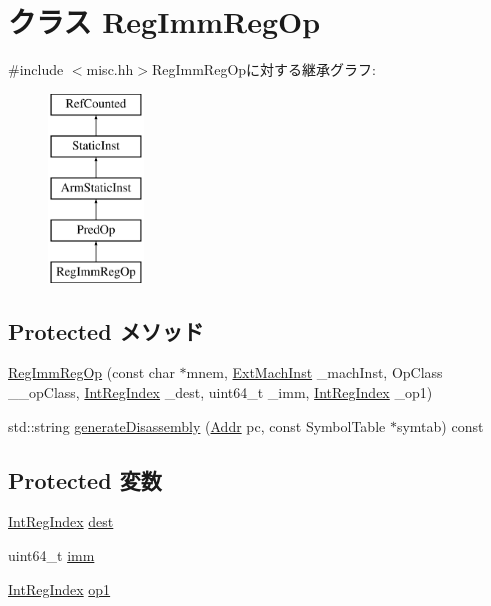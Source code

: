 \hypertarget{classRegImmRegOp}{
\section{クラス RegImmRegOp}
\label{classRegImmRegOp}
}


{\ttfamily \#include $<$misc.hh$>$}RegImmRegOpに対する継承グラフ:\begin{figure}[H]
\begin{center}
\leavevmode
\includegraphics[height=5cm]{classRegImmRegOp}
\end{center}
\end{figure}
\subsection*{Protected メソッド}
\begin{DoxyCompactItemize}
\item 
\hyperlink{classRegImmRegOp_a5923528ee8523386ae835460ab10e116}{RegImmRegOp} (const char $\ast$mnem, \hyperlink{classStaticInst_a5605d4fc727eae9e595325c90c0ec108}{ExtMachInst} \_\-machInst, OpClass \_\-\_\-opClass, \hyperlink{namespaceArmISA_ae64680ba9fb526106829d6bf92fc791b}{IntRegIndex} \_\-dest, uint64\_\-t \_\-imm, \hyperlink{namespaceArmISA_ae64680ba9fb526106829d6bf92fc791b}{IntRegIndex} \_\-op1)
\item 
std::string \hyperlink{classRegImmRegOp_a95d323a22a5f07e14d6b4c9385a91896}{generateDisassembly} (\hyperlink{classm5_1_1params_1_1Addr}{Addr} pc, const SymbolTable $\ast$symtab) const 
\end{DoxyCompactItemize}
\subsection*{Protected 変数}
\begin{DoxyCompactItemize}
\item 
\hyperlink{namespaceArmISA_ae64680ba9fb526106829d6bf92fc791b}{IntRegIndex} \hyperlink{classRegImmRegOp_aec72e8e45bdc87abeeeb75d2a8a9a716}{dest}
\item 
uint64\_\-t \hyperlink{classRegImmRegOp_a2b4406ad2843b5aa12d244d01d8fdc69}{imm}
\item 
\hyperlink{namespaceArmISA_ae64680ba9fb526106829d6bf92fc791b}{IntRegIndex} \hyperlink{classRegImmRegOp_a4c465c43ad568f8bcf8ae71480e9cfea}{op1}
\end{DoxyCompactItemize}


